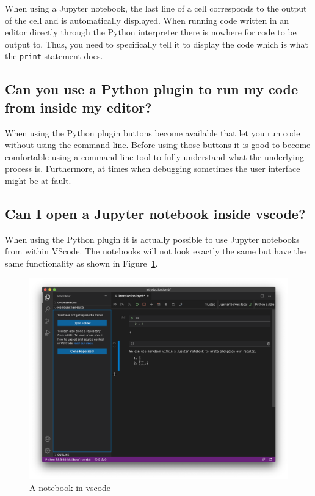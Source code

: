 When using a Jupyter notebook, the last line of a cell corresponds to the
output of the cell and is automatically displayed.
When running code written in an editor directly through the Python interpreter
there is nowhere for code to be output to. Thus, you need to specifically tell it
to display the code which is what the \texttt{print} statement does.


\subsection{Can you use a Python plugin to run my code from inside my editor?}
\label{\detokenize{building-tools/04-editor-and-cli/why/main:can-i-use-a-python-plugin-to-run-my-code-from-inside-my-editor}}

When using the Python plugin buttons become available that let you run code
without using the command line. Before using those buttons it is good to become comfortable using a
command line tool to fully understand what the underlying process is. Furthermore,
at times when debugging sometimes the user interface might be at fault.


\subsection{Can I open a Jupyter notebook inside vscode?}
\label{\detokenize{building-tools/04-editor-and-cli/why/main:can-i-open-a-jupyter-notebook-inside-vscode}}

When using the Python plugin it is actually possible to use Jupyter notebooks
from within VScode.
The notebooks will not look exactly the same but have the same functionality as
shown in Figure~\ref{fig:a_notebook_in_vscode}.

\begin{figure}[htbp]
\centering
\noindent\includegraphics[width=0.750\linewidth]{./assets/notebook_in_vscode/main.png}
\caption{A notebook in vscode}
\label{fig:a_notebook_in_vscode}
\end{figure}


